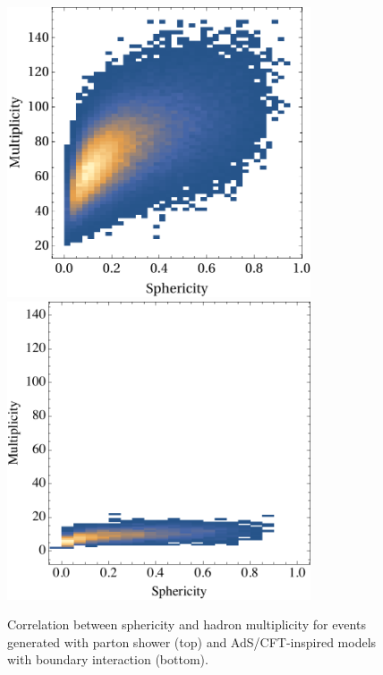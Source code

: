 \begin{enumerate}
\begin{figure}[tb!]
	\centering
		\includegraphics[width=0.8\textwidth]{figures/DS_sphericity_PartonShower.pdf}\\
	\vspace{1cm}
	\includegraphics[width=0.8\textwidth]{figures/DS_sphericity_KK_bdry.pdf}
	\caption{Correlation between sphericity and hadron multiplicity for events generated with parton shower (top) and AdS/CFT-inspired models with boundary interaction (bottom).}
	\label{fig:compmult}
\end{figure}


\end{enumerate}
